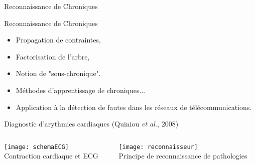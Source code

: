 \documentclass[compress]{beamer}
\begin{document}
\begin{frame}{Reconnaissance de Chroniques}
\begin{center}
\end{center}
\end{frame}

\begin{frame}{Reconnaissance de Chroniques}
\begin{itemize}
\item Propagation de contraintes,
\item Factorisation de l'arbre,
\item Notion de "sous-chronique".
\item Méthodes d'apprentissage de chroniques...
\item Application à la détection de fautes dans les réseaux de télécommunications.
\end{itemize}
\end{frame}

\begin{frame}{Diagnostic d'arythmies cardiaques (Quiniou {\it et al.}, 2008)}
\begin{columns}
\begin{column}{0.55\linewidth}
\begin{center}
\texttt{[image: schemaECG]}\\
\small Contraction cardiaque et ECG
\end{center}
\end{column}
\begin{column}{0.45\linewidth}
\begin{center}
\centering \texttt{[image: reconnaisseur]}\\
\small Principe de reconnaissance de pathologies
\end{center}
\end{column}
\end{columns}
\end{frame}
\end{document}
